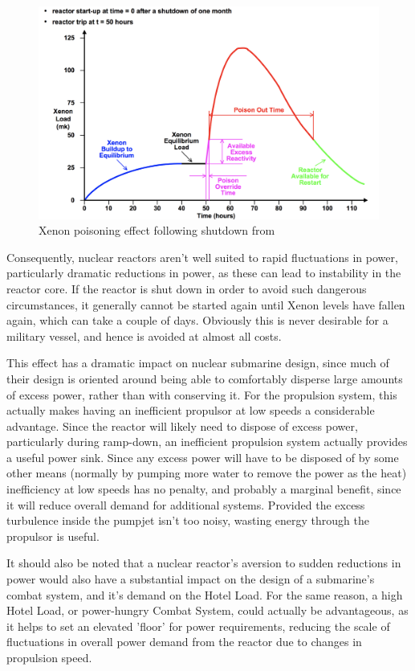 \documentclass{article}\usepackage[]{graphicx}\usepackage[]{color}
\begin{document}
\begin{figure}
\includegraphics[width=\textwidth]{XenonPoison.png}
\caption{Xenon poisoning effect following shutdown from \parencite{garland2005}}
\label{fig:XenonPoison.png}
\end{figure}

Consequently, nuclear reactors aren't well suited to rapid fluctuations in power, particularly dramatic reductions in power, as these can lead to instability in the reactor core.  If the reactor is shut down in order to avoid such dangerous circumstances, it generally cannot be started again until Xenon levels have fallen again, which can take a couple of days.  Obviously this is never desirable for a military vessel, and hence is avoided at almost all costs.

This effect has a dramatic impact on nuclear submarine design, since much of their design is oriented around being able to comfortably disperse large amounts of excess power, rather than with conserving it.  For the propulsion system, this actually makes having an inefficient propulsor at low speeds a considerable advantage.  Since the reactor will likely need to dispose of excess power, particularly during ramp-down, an inefficient propulsion system actually provides a useful power sink.  Since any excess power will have to be disposed of by some other means (normally by pumping more water to remove the power as the heat) inefficiency at low speeds has no penalty, and probably a marginal benefit, since it will reduce overall demand for additional systems.    Provided the excess turbulence inside the pumpjet isn't too noisy, wasting energy through the propulsor is useful.

It should also be noted that a nuclear reactor's aversion to sudden reductions in power would also have a substantial impact on the design of a submarine's combat system, and it's demand on the Hotel Load. For the same reason, a high Hotel Load, or power-hungry Combat System, could actually be advantageous, as it helps to set an elevated 'floor' for power requirements, reducing the scale of fluctuations in overall power demand from the reactor due to changes in propulsion speed.
\end{document}
